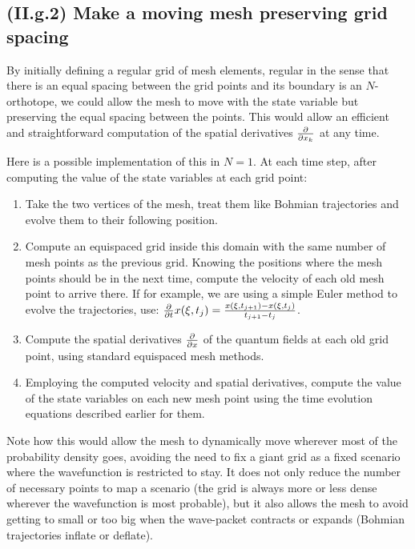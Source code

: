 \documentclass[11pt, a4paper]{article} %
\begin{document}
\subsection*{\bf (II.g.2) Make a moving mesh preserving grid spacing}\vspace{-0.2cm}
By initially defining a regular grid of mesh elements, regular in the sense that there is an equal spacing between the grid points and its boundary is an $N$-orthotope, we could allow the mesh to move with the state variable but preserving the equal spacing between the points. This would allow an efficient and straightforward computation of the spatial derivatives $\pdv{}{x_k}$ at any time. \vspace{-0.1cm}

Here is a possible implementation of this in $N=1$. At each time step, after computing the value of the state variables at each grid point:\vspace{-0.3cm}
\begin{enumerate}
\item Take the two vertices of the mesh, treat them like Bohmian trajectories and evolve them to their following position.\vspace{-0.15cm}
\item Compute an equispaced grid inside this domain with the same number of mesh points as the previous grid. Knowing the positions where the mesh points should be in the next time, compute the velocity of each old mesh point to arrive there. If for example, we are using a simple Euler method to evolve the trajectories, use: $\pdv{}{t}x(\xi,t_{j})=\frac{x(\xi,t_{j+1})-x(\xi,t_{j})}{t_{j+1}-t_j}$.
\item Compute the spatial derivatives $\pdv{}{x}$ of the quantum fields at each old grid point, using standard equispaced mesh methods.
\item Employing the computed velocity and spatial derivatives, compute the value of the state variables on each new mesh point using the time evolution equations described earlier for them.\vspace{-0.2cm}
\end{enumerate}
Note how this would allow the mesh to dynamically move wherever most of the probability density goes, avoiding the need to fix a giant grid as a fixed scenario where the wavefunction is restricted to stay. It does not only reduce the number of necessary points to map a scenario (the grid is always more or less dense wherever the wavefunction is most probable), but it also allows the mesh to avoid getting to small or too big when the wave-packet contracts or expands (Bohmian trajectories inflate or deflate). 
 
\end{document}
